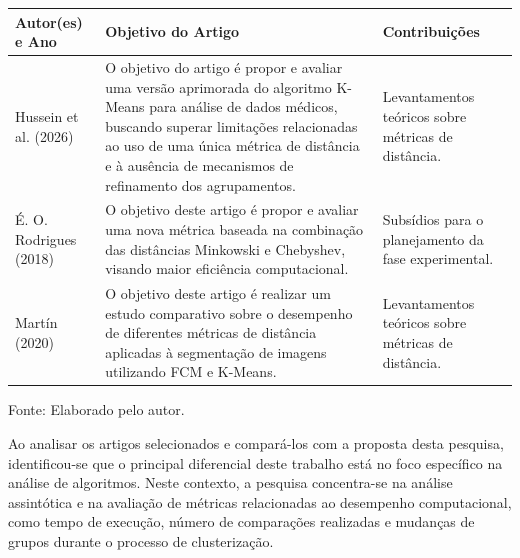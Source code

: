 \documentclass[10pt,a4paper,twocolumn]{article}
\newcounter{quadro}
\begin{document}
\begin{strip}

\centering

\captionsetup{type=quadro}
\label{qua:trabalhos_relacionados}

\renewcommand{\arraystretch}{1.5}

\begin{tabular}{|p{3cm}|p{10cm}|p{5cm}|}
\hline

\textbf{Autor(es) e Ano}
&
\textbf{Objetivo do Artigo}
&
\textbf{Contribuições}
\\

\hline

Hussein et al. (2026)
&
O objetivo do artigo é propor e avaliar uma versão aprimorada do algoritmo K-Means para análise de dados médicos, buscando superar limitações relacionadas ao uso de uma única métrica de distância e à ausência de mecanismos de refinamento dos agrupamentos.
&
Levantamentos teóricos sobre métricas de distância.
\\

\hline

É. O. Rodrigues (2018)
&
O objetivo deste artigo é propor e avaliar uma nova métrica baseada na combinação das distâncias Minkowski e Chebyshev, visando maior eficiência computacional.
&
Subsídios para o planejamento da fase experimental.
\\

\hline

Martín (2020)
&
O objetivo deste artigo é realizar um estudo comparativo sobre o desempenho de diferentes métricas de distância aplicadas à segmentação de imagens utilizando FCM e K-Means.
&
Levantamentos teóricos sobre métricas de distância.
\\

\hline

\end{tabular}

\vspace{0.3cm}

\small Fonte: Elaborado pelo autor.

\end{strip}

Ao analisar os artigos selecionados e compará-los com a proposta desta pesquisa, identificou-se que o principal diferencial deste trabalho está no foco específico na análise de algoritmos. Neste contexto, a pesquisa concentra-se na análise assintótica e na avaliação de métricas relacionadas ao desempenho computacional, como tempo de execução, número de comparações realizadas e mudanças de grupos durante o processo de clusterização.
\end{document}
